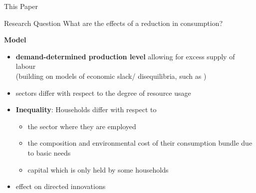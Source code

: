 \documentclass[11pt,aspectratio=169]{beamer}
\begin{document}
\begin{frame}{This Paper}
	\vspace{-4mm}
		\begin{block}{Research Question}
			What are the effects of a reduction in consumption? %
	\end{block}
\textbf{Model}
	\begin{itemize}
		\item  \textbf{demand-determined production level} allowing for excess supply of labour \\
		\small{(building on models of economic slack/ disequilibria, such as \cite{Auerbach2021InequalityEconomy})}
		
		\item sectors differ with respect to the degree of resource usage %
		\item \textbf{Inequality}: Households differ with respect to
		\begin{itemize}
	
\item the sector where they are employed 
\item the composition and environmental cost of their consumption bundle due to basic needs 
\item capital which is only held by some households
		\end{itemize}
	\item effect on directed innovations
	\end{itemize}

\end{frame}
\end{document}
